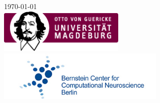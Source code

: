 \documentclass[11pt, oneside]{Thesis} %
\begin{document}
\begin{titlepage}
\begin{center}
{\large \today}\\[1cm] %
\includegraphics[width=6cm]{logo_ovgu.png} %
\includegraphics[width=8cm]{logo_bccn.png} %
 
\end{center}

\end{titlepage}

\end{document}
